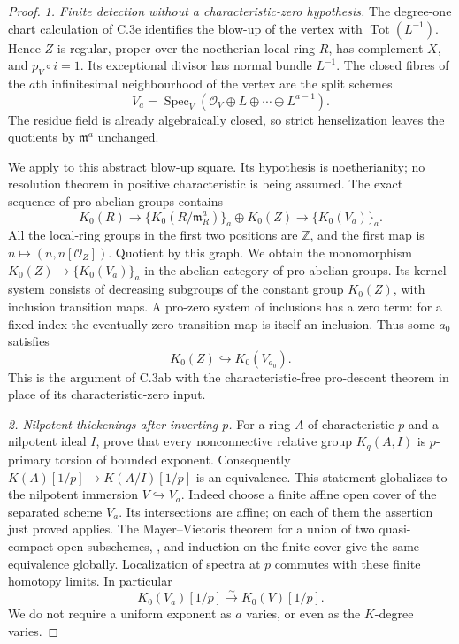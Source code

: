 \begin{proof}
\emph{1. Finite detection without a characteristic-zero hypothesis.}
The degree-one chart calculation of C.3e identifies the blow-up of the
vertex with $\operatorname{Tot}(L^{-1})$. Hence $Z$ is regular,
proper over the noetherian local ring $R$, has complement $X$, and
$p_V\circ i=1$. Its exceptional divisor has normal bundle $L^{-1}$.
The closed fibres of the $a$th infinitesimal neighbourhood of the
vertex are the split schemes
\[
 V_a=\operatorname{Spec}_V
       (\mathcal O_V\oplus L\oplus\cdots\oplus L^{a-1}).
\]
The residue field is already algebraically closed, so strict
henselization leaves the quotients by $\mathfrak m^a$ unchanged.

We apply \citet[Theorem A, equivalence (ii), equation (1.6),
author pp.~2--3]{rootKerzStrunkTamme2018} to this abstract blow-up
square. Its hypothesis is noetherianity; no resolution theorem in
positive characteristic is being assumed. The exact sequence of
pro abelian groups contains
\[
 K_0(R)\longrightarrow
 \{K_0(R/\mathfrak m_R^a)\}_a\oplus K_0(Z)
 \longrightarrow\{K_0(V_a)\}_a.
\]
All the local-ring groups in the first two positions are $\mathbb Z$,
and the first map is $n\mapsto(n,n[\mathcal O_Z])$.
Quotient by this graph. We obtain the monomorphism
$K_0(Z)\to\{K_0(V_a)\}_a$ in the abelian category of pro abelian
groups. Its kernel system consists of decreasing subgroups of the
constant group $K_0(Z)$, with inclusion transition maps. A pro-zero
system of inclusions has a zero term: for a fixed index the
eventually zero transition map is itself an inclusion. Thus some
$a_0$ satisfies
\begin{equation}\label{eq:C3ax-finite}
                   K_0(Z)\hookrightarrow K_0(V_{a_0}).
\end{equation}
This is the argument of C.3ab with the characteristic-free pro-descent
theorem in place of its characteristic-zero input.

\emph{2. Nilpotent thickenings after inverting $p$.}
For a ring $A$ of characteristic $p$ and a nilpotent ideal $I$,
\citet[Theorem A, p.~29]{rootGeisserHesselholt2011} prove that every
nonconnective relative group $K_q(A,I)$ is $p$-primary torsion
of bounded exponent. Consequently $K(A)[1/p]\to K(A/I)[1/p]$
is an equivalence. This statement globalizes to the nilpotent
immersion $V\hookrightarrow V_a$. Indeed choose a finite affine
open cover of the separated scheme $V_a$. Its intersections are
affine; on each of them the assertion just proved applies.
The Mayer--Vietoris theorem for a union of two quasi-compact open
subschemes, \citet[Theorem 8.1]{D_ThomasonTrobaugh1990}, and induction
on the finite cover give the same equivalence globally. Localization
of spectra at $p$ commutes with these finite homotopy limits.
In particular
\begin{equation}\label{eq:C3ax-nil}
                 K_0(V_a)[1/p]\xrightarrow{\sim}K_0(V)[1/p].
\end{equation}
We do not require a uniform exponent as $a$ varies, or even as
the $K$-degree varies.


\end{proof}
